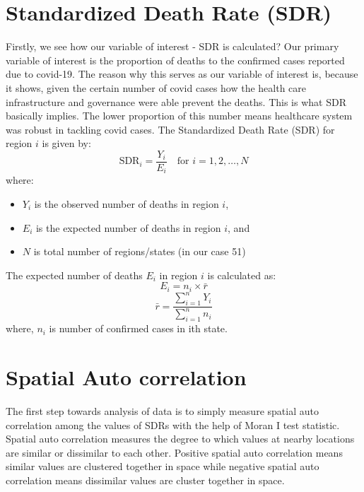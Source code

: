 \documentclass[enabledeprecatedfontcommands,parskip=half,twoside=semi,BCOR=0mm]{scrreprt}
\numberwithin{equation}{chapter}
\theoremstyle{definition}
\theoremstyle{remark}
\begin{document}
    \section{Standardized Death Rate (SDR)}
    Firstly, we see how our variable of interest - SDR is calculated?
    Our primary variable of interest is the proportion of deaths to the confirmed cases reported due to covid-19. The reason why this serves as our variable of interest is, because it shows, given the certain number of covid cases how the health care infrastructure and governance were able prevent the deaths. This is what SDR basically implies. The lower proportion of this number means healthcare system was robust in tackling covid cases.
    The Standardized Death Rate (SDR) for region \(i\) is given by:
    \[
    \text{SDR}_i = \frac{Y_i}{E_i} \quad \text{for } i = 1, 2, \ldots, N
    \]
    where:
    \begin{itemize}
        \item \(Y_i\) is the observed number of deaths in region \(i\),
        \item \(E_i\) is the expected number of deaths in region \(i\), and
        \item \(N\) is total number of regions/states (in our case 51)
    \end{itemize}

    The expected number of deaths \(E_i\) in region \(i\) is calculated as:
    \[
    E_i = n_i \times \bar{r}
    \]
    \[
    \bar{r} = \frac{\sum_{i=1}^{n} Y_i}{\sum_{i=1}^{n} n_i}
    \]
    where, \(n_i\) is number of confirmed cases in ith state.
    
    \section{Spatial Auto correlation}
    
    The first step towards analysis of data is to simply measure spatial auto correlation among the values of SDRs with the help of Moran I test statistic. Spatial auto correlation measures the degree to which values at nearby locations are similar or dissimilar to each other. Positive spatial auto correlation means similar values are clustered together in space while negative spatial auto correlation means dissimilar values are cluster together in space. 
    
\end{document}
